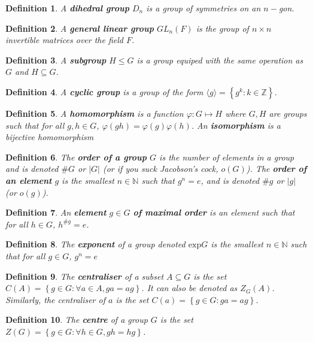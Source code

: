 \documentclass{article}
\newtheorem{definition}{Definition}
\newcommand{\set}[1]{\left\{ #1 \right\}}
\theoremstyle{definition}
\begin{document}
\begin{definition}
    A \textbf{dihedral group} $D_n$ is a group of symmetries on an $n-$gon.
\end{definition}
\begin{definition}
    A \textbf{general linear group} $GL_n(F)$ is the group of $n\times n$ invertible matrices over the field $F$.
\end{definition}
\begin{definition}
    A \textbf{subgroup} $H \leq G$ is a group equiped with the same operation as $G$ and $H \subseteq G$.
\end{definition}
\begin{definition}
    A \textbf{cyclic group} is a group of the form $\langle g \rangle = \set{g^k : k \in \mathbb{Z}}$.
\end{definition}
\begin{definition}
    A \textbf{homomorphism} is a function $\varphi: G \mapsto H$ where $G,H$ are groups such that for all $g,h \in G$, $\varphi(gh)=\varphi(g)\varphi(h)$. An \textbf{isomorphism} is a bijective homomorphism
\end{definition}
\begin{definition}
    The \textbf{order of a group} $G$ is the number of elements in a group and is denoted $\# G$ or $|G|$ (or if you suck Jacobson's cock, $o(G)$). The \textbf{order of an element} $g$ is the smallest $n \in \mathbb{N}$ such that $g^n = e$, and is denoted $\# g$ or $|g|$ (or $o(g)$).
\end{definition}
\begin{definition}
    An \textbf{element} $g \in G$ \textbf{of maximal order} is an element such that for all $h \in G$, $h^{\# g} = e$.
\end{definition}
\begin{definition}
    The \textbf{exponent} of a group denoted $\mathrm{exp} G$ is the smallest $n \in \mathbb{N}$ such that for all $g \in G$, $g^n = e$
\end{definition}
\begin{definition}
    The \textbf{centraliser} of a subset $A \subseteq G$ is the set $C(A) = \set{g \in G : \forall a \in A, ga = ag}$. It can also be denoted as $Z_G(A)$. Similarly, the centraliser of $a$ is the set $C(a) = \set{g \in G : ga=ag}$.
\end{definition}
\begin{definition}
    The \textbf{centre} of a group $G$ is the set $Z(G) = \set{g \in G : \forall h \in G, gh = hg}$.
\end{definition}
\end{document}
